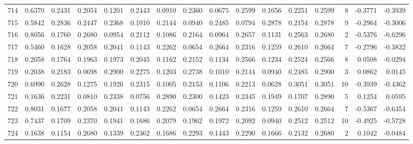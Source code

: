 \begin{tabular}{lrrrrrrrrrrrrrrr}
714 &      0.6370 &  0.2431 &  0.2054 &  0.1201 &  0.2443 &  0.0910 &  0.2360 &  0.0675 &  0.2599 &  0.1656 &   0.2251 &     0.2599 &      8 &                   -0.3771 &                    -0.3939 \\
715 &      0.5842 &  0.2836 &  0.2447 &  0.2368 &  0.1010 &  0.2144 &  0.0940 &  0.2485 &  0.0794 &  0.2878 &   0.2154 &     0.2878 &      9 &                   -0.2964 &                    -0.3006 \\
716 &      0.8056 &  0.1760 &  0.2680 &  0.0954 &  0.2112 &  0.1086 &  0.2164 &  0.0964 &  0.2657 &  0.1131 &   0.2563 &     0.2680 &      2 &                   -0.5376 &                    -0.6296 \\
717 &      0.5460 &  0.1628 &  0.2058 &  0.2041 &  0.1143 &  0.2262 &  0.0654 &  0.2664 &  0.2316 &  0.1259 &   0.2610 &     0.2664 &      7 &                   -0.2796 &                    -0.3832 \\
718 &      0.2058 &  0.1764 &  0.1963 &  0.1973 &  0.2045 &  0.1162 &  0.2152 &  0.1134 &  0.2566 &  0.1234 &   0.2524 &     0.2566 &      8 &                    0.0508 &                    -0.0294 \\
719 &      0.2038 &  0.2183 &  0.0698 &  0.2900 &  0.2275 &  0.1203 &  0.2738 &  0.1010 &  0.2144 &  0.0940 &   0.2485 &     0.2900 &      3 &                    0.0862 &                     0.0145 \\
720 &      0.6990 &  0.2628 &  0.1275 &  0.1926 &  0.2315 &  0.1005 &  0.2153 &  0.1106 &  0.2213 &  0.0628 &   0.3051 &     0.3051 &     10 &                   -0.3939 &                    -0.4362 \\
721 &      0.1636 &  0.2231 &  0.0810 &  0.2338 &  0.0756 &  0.2890 &  0.2300 &  0.1423 &  0.2345 &  0.1949 &   0.1707 &     0.2890 &      5 &                    0.1254 &                     0.0595 \\
722 &      0.8031 &  0.1677 &  0.2058 &  0.2041 &  0.1143 &  0.2262 &  0.0654 &  0.2664 &  0.2316 &  0.1259 &   0.2610 &     0.2664 &      7 &                   -0.5367 &                    -0.6354 \\
723 &      0.7437 &  0.1709 &  0.2370 &  0.1941 &  0.1686 &  0.2079 &  0.1962 &  0.1972 &  0.2092 &  0.0940 &   0.2512 &     0.2512 &     10 &                   -0.4925 &                    -0.5728 \\
724 &      0.1638 &  0.1154 &  0.2680 &  0.1339 &  0.2362 &  0.1686 &  0.2293 &  0.1443 &  0.2290 &  0.1666 &   0.2132 &     0.2680 &      2 &                    0.1042 &                    -0.0484 \\

\end{tabular}
